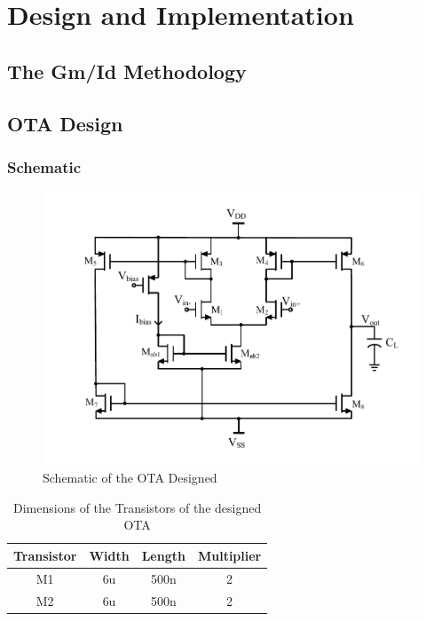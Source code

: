 \chapter{Design and Implementation}
\section{The Gm/Id Methodology}
\section{OTA Design}


\subsection{Schematic}


\begin{figure} [H]
\centering
\includegraphics[scale=1]{Figures/Schematics/OTA_NMOS_Vbias.pdf}
\caption{Schematic of the OTA Designed}
\end{figure}

\begin{table} [H]
\centering
\begin{tabular}{@{}cccc@{}}
\toprule
Transistor			& Width				& Length			& Multiplier \\ \midrule
M1					& 6u				& 500n				&2			\\
M2					& 6u				& 500n				&2			\\ \bottomrule
\end{tabular}
\caption{Dimensions of the Transistors of the designed OTA}
\end{table}

